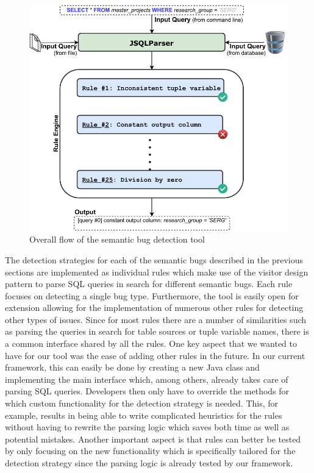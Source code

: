 \begin{figure}[ht]
    \centering
    \includegraphics{img/tool_flow.pdf}
    \caption{Overall flow of the semantic bug detection tool}
    \label{fig:tool_flow}
\end{figure}

The detection strategies for each of the semantic bugs described in the previous sections are implemented as individual rules which make use of the visitor design pattern to parse SQL queries in search for different semantic bugs. Each rule focuses on detecting a single bug type. Furthermore, the tool is easily open for extension allowing for the implementation of numerous other rules for detecting other types of issues. Since for most rules there are a number of similarities such as parsing the queries in search for table sources or tuple variable names, there is a common interface shared by all the rules. 
One key aspect that we wanted to have for our tool was the ease of adding other rules in the future. In our current framework, this can easily be done by creating a new Java class and implementing the main interface which, among others, already takes care of parsing SQL queries. Developers then only have to override the methods for which custom functionality for the detection strategy is needed. This, for example, results in being able to write complicated heuristics for the rules without having to rewrite the parsing logic which saves both time as well as potential mistakes. Another important aspect is that rules can better be tested by only focusing on the new functionality which is specifically tailored for the detection strategy since the parsing logic is already tested by our framework.

